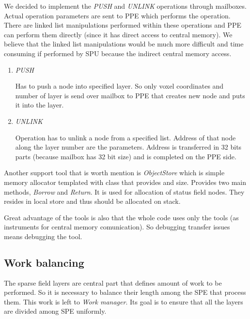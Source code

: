 \par
We decided to implement the \emph{PUSH} and \emph{UNLINK} operations through mailboxes.
Actual operation parameters are sent to PPE which performs the operation.
There are linked list manipulations performed within these operations and PPE can perform them directly (since it has direct access to central memory).
We believe that the linked list manipulations would be much more difficult and time consuming if performed by SPU because the indirect central memory access.

\begin{enumerate}
\item \emph{PUSH}
\par
Has to push a node into specified layer.
So only voxel coordinates and number of layer is send over mailbox to PPE that creates new node and puts it into the layer.

\item \emph{UNLINK}
\par
Operation has to unlink a node from a specified list.
Address of that node along the layer number are the parameters.
Address is transferred in 32 bits parts (because mailbox has 32 bit size) and is completed on the PPE side.
\end{enumerate}

\par
Another support tool that is worth mention is \emph{ObjectStore} which is simple memory allocator templated with class that provides and size.
Provides two main methods, \emph{Borrow} and \emph{Return}.
It is used for allocation of status field nodes.
They resides in local store and thus should be allocated on stack.

\par
Great advantage of the tools is also that the whole code uses only the tools (as instruments for central memory comunication).
So debugging transfer issues means debugging the tool.

\subsection{Work balancing}

\par
The sparse field layers are central part that defines amount of work to be performed.
So it is necessary to balance their length among the SPE that process them.
This work is left to \emph{Work manager}.
Its goal is to ensure that all the layers are divided among SPE uniformly.

